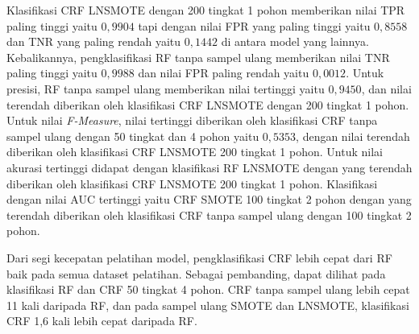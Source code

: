 Klasifikasi CRF LNSMOTE dengan 200 tingkat 1 pohon memberikan nilai TPR paling
tinggi yaitu $0,9904$ tapi dengan nilai FPR yang paling tinggi yaitu $0,8558$
dan TNR yang paling rendah yaitu $0,1442$ di antara model yang lainnya.
Kebalikannya, pengklasifikasi RF tanpa sampel ulang memberikan nilai TNR paling
tinggi yaitu $0,9988$ dan nilai FPR paling rendah yaitu $0,0012$.
Untuk presisi, RF tanpa sampel ulang memberikan nilai tertinggi yaitu $0,9450$,
dan nilai terendah diberikan oleh klasifikasi CRF LNSMOTE dengan 200 tingkat 1
pohon.
Untuk nilai \textit{F-Measure}, nilai tertinggi diberikan oleh klasifikasi CRF
tanpa sampel ulang dengan 50 tingkat dan 4 pohon yaitu $0,5353$, dengan nilai
terendah diberikan oleh klasifikasi CRF LNSMOTE 200 tingkat 1 pohon.
Untuk nilai akurasi tertinggi didapat dengan klasifikasi RF LNSMOTE dengan
yang terendah diberikan oleh klasifikasi CRF LNSMOTE 200 tingkat 1 pohon.
Klasifikasi dengan nilai AUC tertinggi yaitu CRF SMOTE 100 tingkat 2 pohon
dengan yang terendah diberikan oleh klasifikasi CRF tanpa sampel ulang dengan
100 tingkat 2 pohon.

Dari segi kecepatan pelatihan model, pengklasifikasi CRF lebih cepat dari RF
baik pada semua dataset pelatihan.
Sebagai pembanding, dapat dilihat pada klasifikasi RF dan CRF 50 tingkat 4
pohon.
CRF tanpa sampel ulang lebih cepat 11 kali daripada RF, dan pada sampel ulang
SMOTE dan LNSMOTE, klasifikasi CRF 1,6 kali lebih cepat daripada RF.


